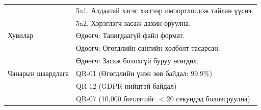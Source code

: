 \begin{longtable}{|L{4cm}|L{\dimexpr\textwidth-4cm-3\arrayrulewidth\relax}|}
                      & \quad 5a1. Алдаатай хэсэг хэсгээр импортлогдож тайлан үүснэ. \\ 
                      & \quad 5a2. Хэрэглэгч засаж дахин оруулна. \\ \hline
Хувилар & Өдөөгч: Танигдаагүй файл формат.\\ 
                    & Өдөөгч: Өгөгдлийн сангийн холболт тасарсан.\\ 
                    & Өдөөгч: Засаж болохгүй буруу өгөгдөл. \\ \hline
Чанарын шаардлага & QR-01 (Өгөгдлийн үнэн зөв байдал: 99.9\%)\\ 
          & QR-12 (GDPR нийцтэй байдал)\\ 
          & QR-07 (10,000 бичлэгийг $<$20 секундэд боловсруулна) \\ \hline

\end{longtable}
